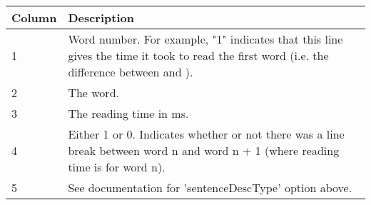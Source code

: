 \documentclass[
]{article}
\begin{document}
\begin{RaggedRight}\small\begin{longtable}[]{p{1.7in}p{4.3in}}
\toprule
\begin{minipage}[b]{0.39\columnwidth}\raggedright
\textbf{Column}\strut
\end{minipage} & \begin{minipage}[b]{0.55\columnwidth}\raggedright
\textbf{Description}\strut
\end{minipage}\tabularnewline
\midrule
\endhead
\begin{minipage}[t]{0.39\columnwidth}\raggedright
1\strut
\end{minipage} & \begin{minipage}[t]{0.55\columnwidth}\raggedright
Word number. For example, "1" indicates that this line gives the time it
took to read the first word (i.e. the difference between and ).\strut
\end{minipage}\tabularnewline
\begin{minipage}[t]{0.39\columnwidth}\raggedright
2\strut
\end{minipage} & \begin{minipage}[t]{0.55\columnwidth}\raggedright
The word.\strut
\end{minipage}\tabularnewline
\begin{minipage}[t]{0.39\columnwidth}\raggedright
3\strut
\end{minipage} & \begin{minipage}[t]{0.55\columnwidth}\raggedright
The reading time in ms.\strut
\end{minipage}\tabularnewline
\begin{minipage}[t]{0.39\columnwidth}\raggedright
4\strut
\end{minipage} & \begin{minipage}[t]{0.55\columnwidth}\raggedright
Either 1 or 0. Indicates whether or not there was a line break between
word n and word n + 1 (where reading time is for word n).\strut
\end{minipage}\tabularnewline
\begin{minipage}[t]{0.39\columnwidth}\raggedright
5\strut
\end{minipage} & \begin{minipage}[t]{0.55\columnwidth}\raggedright
See documentation for 'sentenceDescType' option above.\strut
\end{minipage}\tabularnewline
\bottomrule
\end{longtable}\normalsize\end{RaggedRight}
\end{document}
